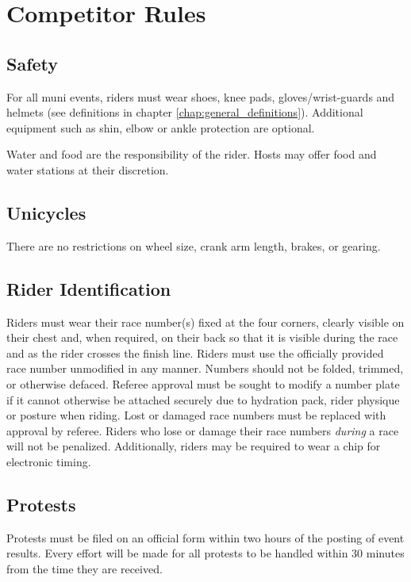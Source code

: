 \chapter{Competitor Rules}

\section{Safety}
For all muni events, riders must wear shoes, knee pads, gloves/wrist-guards and helmets (see definitions in chapter \ref{chap:general_definitions}).
Additional equipment such as shin, elbow or ankle protection are optional.

Water and food are the responsibility of the rider.
Hosts may offer food and water stations at their discretion.

\section{Unicycles}

There are no restrictions on wheel size, crank arm length, brakes, or gearing.

\section{Rider Identification}

Riders must wear their race number(s) fixed at the four corners, clearly visible on their chest and, when required, on their back so that it is visible during the race and as the rider crosses the finish line.
Riders must use the officially provided race number unmodified in any manner.
Numbers should not be folded, trimmed, or otherwise defaced.
Referee approval must be sought to modify a number plate if it cannot otherwise be attached securely due to hydration pack, rider physique or posture when riding.
Lost or damaged race numbers must be replaced with approval by referee.
Riders who lose or damage their race numbers \textit{during} a race will not be penalized.
Additionally, riders may be required to wear a chip for electronic timing.

\section{Protests}

Protests must be filed on an official form within two hours of the posting of event results.
Every effort will be made for all protests to be handled within 30 minutes from the time they are received.

